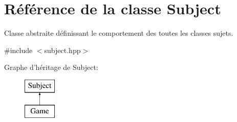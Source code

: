 \hypertarget{classSubject}{\section{Référence de la classe Subject}
\label{classSubject}
}


Classe abstraite définissant le comportement des toutes les classes sujets.  




{\ttfamily \#include $<$subject.\+hpp$>$}

Graphe d'héritage de Subject\+:\begin{figure}[H]
\begin{center}
\leavevmode
\includegraphics[height=2.000000cm]{classSubject}
\end{center}
\end{figure}

